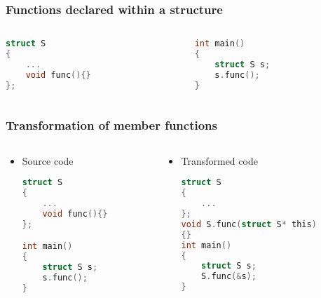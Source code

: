\documentclass{beamer}
\begin{document}
\begin{frame}[fragile]
    \frametitle{Functions declared within a structure}

    \begin{example}
        \small
        \begin{columns}
            \begin{column}[]{0.4\textwidth}
                \begin{lstlisting}[language=C]
struct S
{
    ...
    void func(){}
};
                \end{lstlisting}

            \end{column}

            \begin{column}[]{0.4\textwidth}
                \begin{lstlisting}[language=C]
int main()
{
    struct S s;
    s.func();
}
                \end{lstlisting}
            \end{column}
        \end{columns}
    \end{example}
\end{frame}

\begin{frame}[fragile]
    \frametitle{Transformation of member functions}

    \begin{columns}
        \begin{column}[]{0.5\textwidth}
            \begin{itemize}
                \item Source code
                      \begin{lstlisting}[language=C]
struct S
{
    ...
    void func(){}
};

int main()
{
    struct S s;
    s.func();
}
                    \end{lstlisting}
            \end{itemize}
        \end{column}

        \begin{column}[]{0.7\textwidth}
            \begin{itemize}
                \item Transformed code
                      \begin{lstlisting}[language=C]
struct S
{
    ...
};
void S.func(struct S* this)
{}
int main()
{
    struct S s;
    S.func(&s);
}
                \end{lstlisting}
            \end{itemize}
        \end{column}
    \end{columns}

\end{frame}
\end{document}
